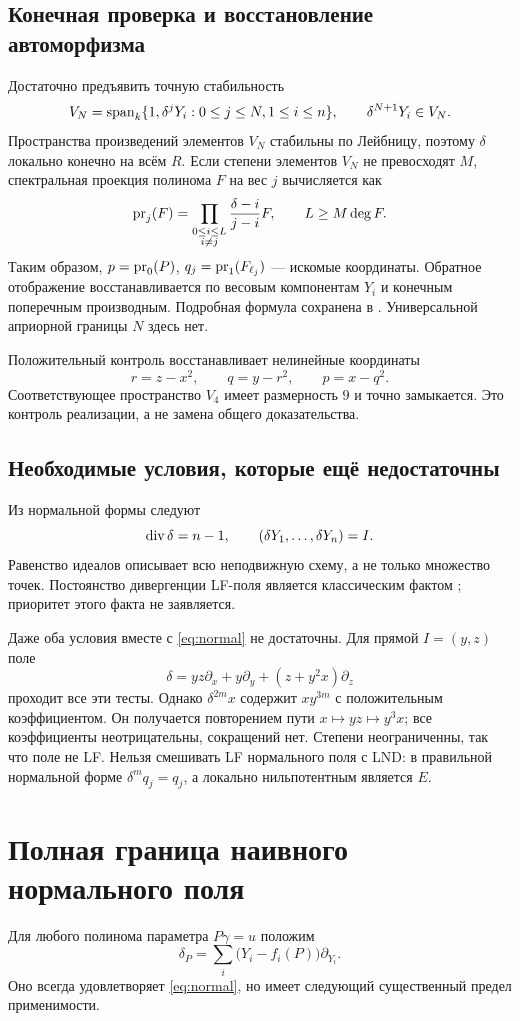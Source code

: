 \subsection{Конечная проверка и восстановление автоморфизма}
Достаточно предъявить точную стабильность
\[
V_N=\operatorname{span}_k\{1,\delta^jY_i:0\le j\le N, 1\le i\le n\},\qquad
\delta^{N+1}Y_i\in V_N.
\]
Пространства произведений элементов $V_N$ стабильны по Лейбницу,
поэтому $\delta$ локально конечно на всём $R$.
Если степени элементов $V_N$ не превосходят $M$, спектральная
проекция полинома $F$ на вес $j$ вычисляется как
\[
\operatorname{pr}_j(F)=\prod_{\substack{0\le i\le L\\i\ne j}}
\frac{\delta-i}{j-i}F,\qquad L\ge M\deg F.
\]
Таким образом,
$p=\operatorname{pr}_0(P)$, $q_j=\operatorname{pr}_1(F_{\ell_j})$ --- искомые координаты.
Обратное отображение восстанавливается по весовым компонентам
$Y_i$ и конечным поперечным производным. Подробная формула сохранена
в . Универсальной априорной границы $N$ здесь нет.

Положительный контроль восстанавливает нелинейные координаты
\[
r=z-x^2,\qquad q=y-r^2,\qquad p=x-q^2.
\]
Соответствующее пространство $V_4$ имеет размерность $9$ и точно
замыкается. Это контроль реализации, а не замена общего доказательства.

\subsection{Необходимые условия, которые ещё недостаточны}
Из нормальной формы следуют
\[
\operatorname{div}\delta=n-1,\qquad (\delta Y_1,\ldots,\delta Y_n)=I.
\]
Равенство идеалов описывает всю неподвижную схему, а не только
множество точек. Постоянство дивергенции LF-поля является классическим
фактом \cite{Nowicki}; приоритет этого факта не заявляется.

Даже оба условия вместе с \eqref{eq:normal} не достаточны.
Для прямой $I=(y,z)$ поле
\[
\delta=yz\partial_x+y\partial_y+(z+y^2x)\partial_z
\]
проходит все эти тесты. Однако $\delta^{2m}x$ содержит
$xy^{3m}$ с положительным коэффициентом. Он получается повторением
пути $x\mapsto yz\mapsto y^3x$; все коэффициенты неотрицательны,
сокращений нет. Степени неограниченны, так что поле не LF.
Нельзя смешивать LF нормального поля с LND: в правильной нормальной
форме $\delta^m q_j=q_j$, а локально нильпотентным является $E$.

\section{Полная граница наивного нормального поля}
Для любого полинома параметра $P\gamma=u$ положим
\[
\delta_P=\sum_i\bigl(Y_i-f_i(P)\bigr)\partial_{Y_i}.
\]
Оно всегда удовлетворяет \eqref{eq:normal}, но имеет следующий
существенный предел применимости.

